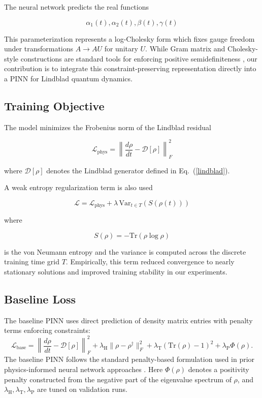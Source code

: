 \documentclass[11pt]{article}
\begin{document}
The neural network predicts the real functions

\[
\alpha_1(t),\alpha_2(t),\beta(t),\gamma(t)
\]

This parameterization represents a log-Cholesky form which fixes gauge freedom under transformations $A \rightarrow AU$ for unitary $U$.
While Gram matrix and Cholesky-style constructions are standard tools for enforcing positive semidefiniteness \cite{horn1990}, our contribution is to integrate this constraint-preserving representation directly into a PINN for Lindblad quantum dynamics.

\subsection{Training Objective}

The model minimizes the Frobenius norm of the Lindblad residual

\begin{equation}
\mathcal{L}_{\mathrm{phys}}
=
\left\|
\frac{d\rho}{dt}
-
\mathcal{D}[\rho]
\right\|_F^2
\label{physloss}
\end{equation}

where $\mathcal{D}[\rho]$ denotes the Lindblad generator defined in Eq.~(\ref{lindblad}).

A weak entropy regularization term is also used

\begin{equation}
\mathcal{L}
=
\mathcal{L}_{\mathrm{phys}}
+
\lambda \,
\mathrm{Var}_{t \in T}
\left(
S(\rho(t))
\right)
\label{totalloss}
\end{equation}

where

\begin{equation}
S(\rho) = -\mathrm{Tr}(\rho \log \rho)
\label{entropy}
\end{equation}

is the von Neumann entropy and the variance is computed across the discrete training time grid $T$.
Empirically, this term reduced convergence to nearly stationary solutions and improved training stability in our experiments.

\subsection{Baseline Loss}

The baseline PINN uses direct prediction of density matrix entries with penalty terms enforcing constraints:
\begin{equation}
\mathcal{L}_{\mathrm{base}} =
\left\|\frac{d\rho}{dt} - \mathcal{D}[\rho]\right\|_F^2
+ \lambda_{\mathrm{H}}\|\rho-\rho^\dagger\|_F^2
+ \lambda_{\mathrm{T}}(\mathrm{Tr}(\rho)-1)^2
+ \lambda_{\mathrm{P}}\Phi(\rho).
\label{baseloss}
\end{equation}
The baseline PINN follows the standard penalty-based formulation used in prior physics-informed neural network approaches \cite{raissi2019,bondesan2022}. Here $\Phi(\rho)$ denotes a positivity penalty constructed from the negative part of the eigenvalue spectrum of $\rho$, and $\lambda_{\mathrm{H}},\lambda_{\mathrm{T}},\lambda_{\mathrm{P}}$ are tuned on validation runs.
\end{document}
